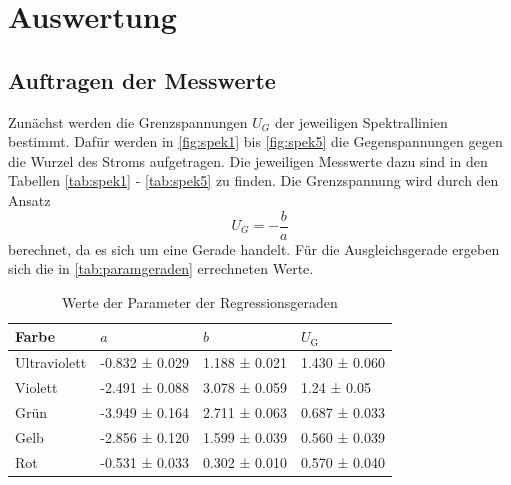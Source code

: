 \section{Auswertung}
\label{sec:Auswertung}

\subsection{Auftragen der Messwerte}
Zunächst werden die Grenzspannungen $U_G$ der jeweiligen Spektrallinien bestimmt.
Dafür werden in \autoref{fig:spek1} bis \autoref{fig:spek5} die Gegenspannungen gegen die Wurzel des Stroms aufgetragen.
Die jeweiligen Messwerte dazu sind in den Tabellen \ref{tab:spek1} - \ref{tab:spek5} zu finden.
Die Grenzspannung wird durch den Ansatz
\begin{equation*}
  U_G = - \frac{b}{a}
\end{equation*}
berechnet, da es sich um eine Gerade handelt.
Für die Ausgleichsgerade ergeben sich die in \autoref{tab:paramgeraden} errechneten Werte.

\begin{table}
  \centering
  \caption{Werte der Parameter der Regressionsgeraden}
  \label{tab:paramgeraden}
  \begin{tabular}{ |p{3cm}||p{3cm}|p{3cm}|p{3cm}|  }
    \hline
    Farbe & $a$ & $b$ & $U_\text{G}$ \\
    \hline
    Ultraviolett   &  -0.832 ± 0.029   & 1.188 ± 0.021 &   1.430 ± 0.060\\
    Violett &   -2.491 ± 0.088  & 3.078 ± 0.059   & 1.24 ± 0.05\\
    Grün & -3.949 ± 0.164 & 2.711 ± 0.063 & 0.687 ± 0.033\\
    Gelb    & -2.856 ± 0.120 & 1.599 ± 0.039 & 0.560 ± 0.039\\
    Rot &  -0.531 ± 0.033  & 0.302 ± 0.010 & 0.570 ± 0.040\\
    \hline
   \end{tabular}
\end{table}


